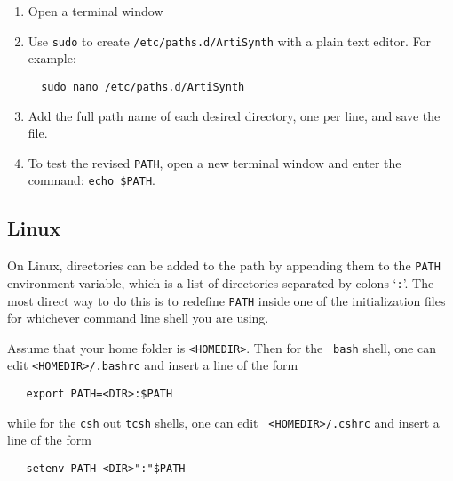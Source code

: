 \documentclass{article}
\begin{document}
\begin{enumerate}

\item Open a terminal window

\item Use {\tt sudo} to create {\tt /etc/paths.d/ArtiSynth} with a plain
text editor. For example:
\begin{verbatim}
  sudo nano /etc/paths.d/ArtiSynth
\end{verbatim}

\item Add the full path name of each desired directory, one per line,
and save the file.

\item To test the revised {\tt PATH}, open a new terminal
window and enter the command: {\tt echo \$PATH}.

\end{enumerate}

\subsection*{Linux}
\label{Linux}

On Linux, directories can be added to the path by appending them to
the {\tt PATH} environment variable, which is a list of directories
separated by colons `{\tt :}'. The most direct way to do this is to
redefine {\tt PATH} inside one of the initialization files for
whichever command line shell you are using.

Assume that your home folder is {\tt <HOMEDIR>}. Then for the {\tt
bash} shell, one can edit {\tt <HOMEDIR>/.bashrc} and insert a line of
the form
\begin{verbatim}
   export PATH=<DIR>:$PATH
\end{verbatim}
while for the {\tt csh} out {\tt tcsh} shells, one can edit {\tt
<HOMEDIR>/.cshrc} and insert a line of the form
\begin{verbatim}
   setenv PATH <DIR>":"$PATH
\end{verbatim}
\end{document}
